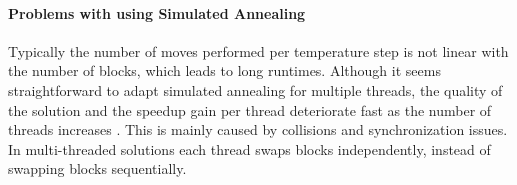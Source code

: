 \documentclass[a4paper,oneside,12pt]{article}
\begin{document}


\paragraph{Problems with using Simulated Annealing}
Typically the number of moves performed per temperature step is not linear with the number of blocks, which leads to long runtimes.
Although it seems straightforward to adapt simulated annealing for multiple threads, the quality of the solution and the speedup gain per thread deteriorate fast as the number of threads increases \cite{ludwin2011}. This is mainly caused by collisions and synchronization issues. In multi-threaded solutions each thread swaps blocks independently, instead of swapping blocks sequentially.
\end{document}
